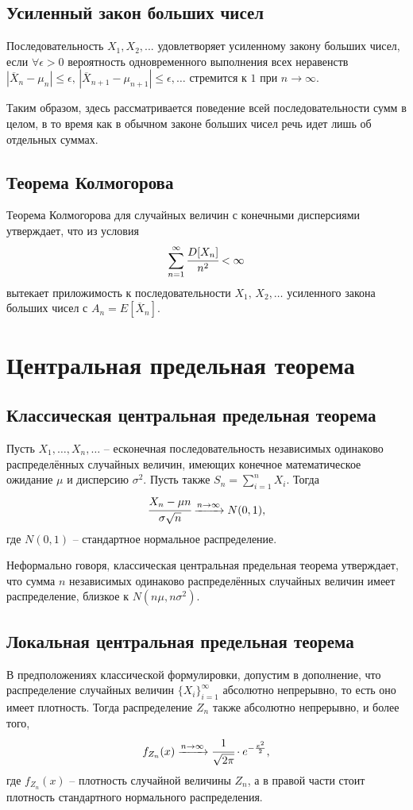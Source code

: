 \documentclass{article}
\begin{document}
\subsection{Усиленный закон больших чисел}
Последовательность ${ X_{1},X_{2},...}$ удовлетворяет усиленному закону больших чисел, если $\forall \epsilon >0$ вероятность одновременного выполнения всех неравенств $|\overline{X}_n-\mu_n|\leq\epsilon,\,|\overline{X}_{n+1}-\mu_{n+1}|\leq\epsilon,\dots$ стремится к $1$ при $n\to\infty$.

Таким образом, здесь рассматривается поведение всей последовательности сумм в целом, в то время как в обычном законе больших чисел речь идет лишь об отдельных суммах.

\subsection{Теорема Колмогорова}
Теорема Колмогорова для случайных величин с конечными дисперсиями утверждает, что из условия
$$ \sum_{n=1}^{\infty} \cfrac{D[X_n]}{n^2}<\infty $$
вытекает приложимость к последовательности $X_1,\,X_2,\dots$ усиленного закона больших чисел с $A_n=E[\overline{X}_n]$.
\newpage
\section{Центральная предельная теорема}
\subsection{Классическая центральная предельная теорема}
Пусть $X_1,\dots,X_n,\dots$ -- есконечная последовательность независимых одинаково распределённых случайных величин, имеющих конечное математическое ожидание $\mu$ и дисперсию $\sigma^2$. Пусть также $S_n=\sum_{i=1}^n X_i$. Тогда
$$ \cfrac{X_n-\mu n}{\sigma\sqrt{n}}\xrightarrow{n\to\infty} N(0,1), $$
где $N(0,1)$ -- стандартное нормальное распределение.

Неформально говоря, классическая центральная предельная теорема утверждает, что сумма $n$ независимых одинаково распределённых случайных величин имеет распределение, близкое к $N(n\mu,n\sigma^2)$.
\subsection{Локальная центральная предельная теорема}
В предположениях классической формулировки, допустим в дополнение, что распределение случайных величин $\{X_i\}_{i=1}^{\infty}$ абсолютно непрерывно, то есть оно имеет плотность. Тогда распределение $Z_n$ также абсолютно непрерывно, и более того,
$$ f_{Z_n}(x) \xrightarrow{n\to\infty} \cfrac{1}{\sqrt{2\pi}}\cdot e^{-\frac{x^2}{2}}, $$
где $f_{Z_n}(x)$ -- плотность случайной величины $Z_n$, а в правой части стоит плотность стандартного нормального распределения.
\end{document}
